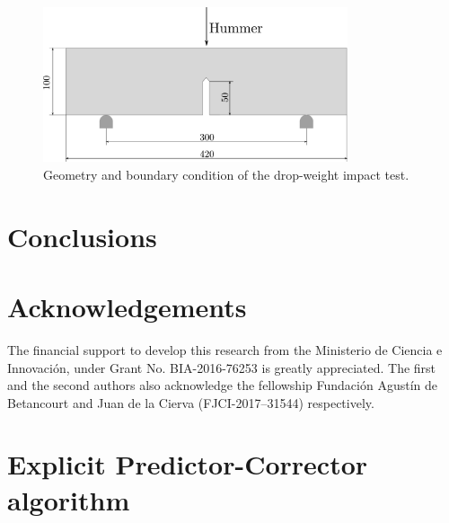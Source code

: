 \documentclass[preprint,12pt,a4paper]{elsarticle}
\begin{document}
\begin{figure}
  \centering
  \includegraphics[width=0.8\textwidth]{Figures/Drop_weight}
  \caption{Geometry and boundary condition of the drop-weight impact test.}
  \label{fig:geometry-drop-weight-impact-test}
\end{figure}


\section{Conclusions}
\label{sec:6}


\section*{Acknowledgements}
The financial support to develop this research from the Ministerio de
Ciencia e Innovaci\'on, under Grant No. BIA-2016-76253 is greatly
appreciated. The first and the second authors also acknowledge the
fellowship Fundaci\'on Agust\'in de Betancourt and Juan de la Cierva
(FJCI-2017–31544) respectively.

\appendix

\clearpage

\section{Explicit Predictor-Corrector algorithm}
\label{sec:expl-pred-corr}
\end{document}
